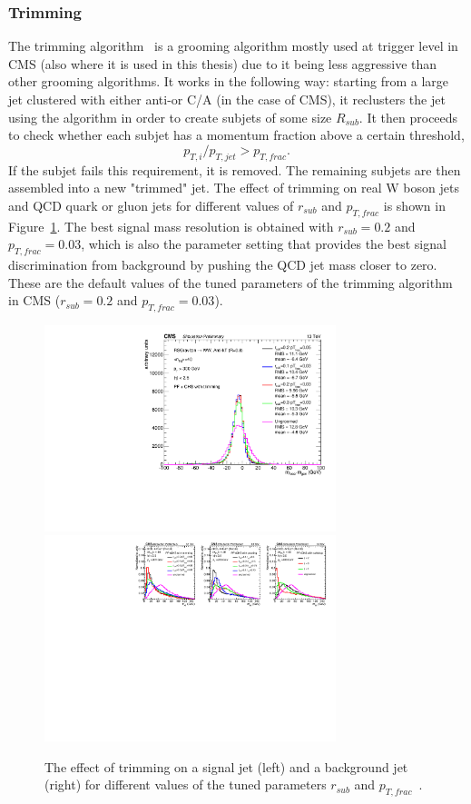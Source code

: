 \subsubsection{Trimming}
\label{sec:objreco:trimming}
The trimming algorithm~\cite{Krohn:2009th} is a grooming algorithm mostly used at trigger level in CMS (also where it is used in this thesis) due to it being less aggressive than other grooming algorithms. It works in the following way: starting from a large jet clustered with either anti-\kt or C/A (in the case of CMS), it reclusters the jet using the \kt algorithm in order to create subjets of some size $R_{sub}$.  It then proceeds to check whether each subjet has a momentum fraction above a certain threshold,
\begin{equation*}
p_{T,i}/p_{T,jet}>p_{T,frac}.
\end{equation*}
If the subjet fails this requirement, it is removed. The remaining subjets are then assembled into a new "trimmed" jet.
The effect of trimming on real W boson jets and QCD quark or gluon jets for different values of $r_{sub}$ and $p_{T,frac}$ is shown in Figure~\ref{fig:objreco:trimming}. 
The best signal mass resolution is obtained with $r_{sub}=0.2$ and $p_{T,frac}=0.03$, which is also the parameter setting that provides the best signal discrimination from background by pushing the QCD jet mass closer to zero. These are the default values of the tuned parameters of the trimming algorithm in CMS ($r_{sub}=0.2$ and $p_{T,frac}=0.03$).
\begin{figure}[h!] 
    \centering 
    \includegraphics[height=6cm]{figures/event_reconstruction/sig_trimming.pdf}
    \includegraphics[height=6cm]{figures/event_reconstruction/bkg_trimming-noData.pdf}
    \caption{The effect of trimming on a signal jet (left) and a background jet (right) for different values of the tuned parameters $r_{sub}$ and $p_{T,frac}$~\cite{CMS-PAS-JME-14-001}.}
    \label{fig:objreco:trimming}
\end{figure}

